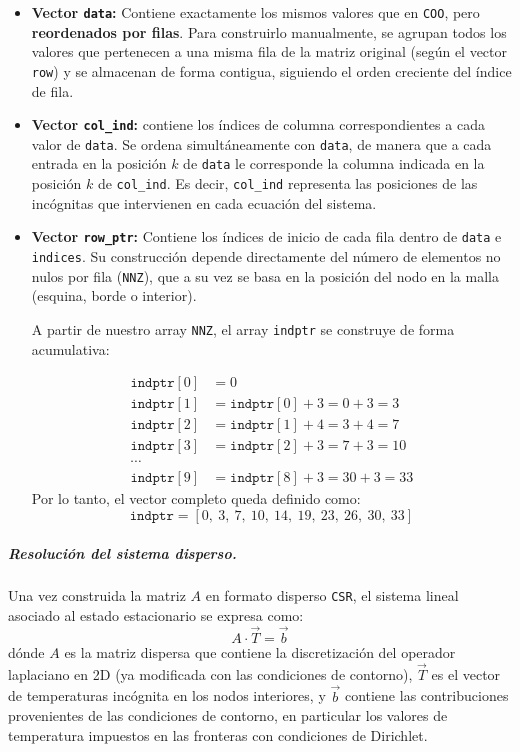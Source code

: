 \documentclass{article}
\begin{document}
\begin{itemize}
    \item \textbf{Vector \texttt{data}:} Contiene exactamente los mismos valores que en \texttt{COO}, pero \textbf{reordenados por filas}. Para construirlo manualmente, se agrupan todos los valores que pertenecen a una misma fila de la matriz original (según el vector \texttt{row}) y se almacenan de forma contigua, siguiendo el orden creciente del índice de fila. 
    \item \textbf{Vector \texttt{col\_ind}:} contiene los índices de columna correspondientes a cada valor de \texttt{data}. Se ordena simultáneamente con \texttt{data}, de manera que a cada entrada en la posición $k$ de \texttt{data} le corresponde la columna indicada en la posición $k$ de \texttt{col\_ind}. Es decir, \texttt{col\_ind} representa las posiciones de las incógnitas que intervienen en cada ecuación del sistema.
    \item \textbf{Vector \texttt{row\_ptr}:} Contiene los índices de inicio de cada fila dentro de \texttt{data} e \texttt{indices}. Su construcción depende directamente del número de elementos no nulos por fila (\texttt{NNZ}), que a su vez se basa en la posición del nodo en la malla (esquina, borde o interior).

    A partir de nuestro array \texttt{NNZ}, el array \texttt{indptr} se construye de forma acumulativa:

    $$
    \begin{aligned}
    \texttt{indptr}[0] &= 0 \\
    \texttt{indptr}[1] &= \texttt{indptr}[0] + 3 = 0 + 3 = 3 \\
    \texttt{indptr}[2] &= \texttt{indptr}[1] + 4 = 3 + 4 = 7 \\
    \texttt{indptr}[3] &= \texttt{indptr}[2] + 3 = 7 + 3 = 10 \\
    \cdots \\
    \texttt{indptr}[9] &= \texttt{indptr}[8] + 3 = 30 + 3 = 33
    \end{aligned}
    $$
    \noindent
    Por lo tanto, el vector completo queda definido como:
    $$
    \texttt{indptr} = [0,\ 3,\ 7,\ 10,\ 14,\ 19,\ 23,\ 26,\ 30,\ 33]
    $$
\end{itemize}

\subparagraph{Resolución del sistema disperso.}

Una vez construida la matriz $A$ en formato disperso \texttt{CSR}, el sistema lineal asociado al estado estacionario se expresa como:
$$
A \cdot \vec{T} = \vec{b}
$$
dónde $A$ es la matriz dispersa que contiene la discretización del operador laplaciano en 2D (ya modificada con las condiciones de contorno), $\vec{T}$ es el vector de temperaturas incógnita en los nodos interiores, y $\vec{b}$ contiene las contribuciones provenientes de las condiciones de contorno, en particular los valores de temperatura impuestos en las fronteras con condiciones de Dirichlet.\\
\end{document}
